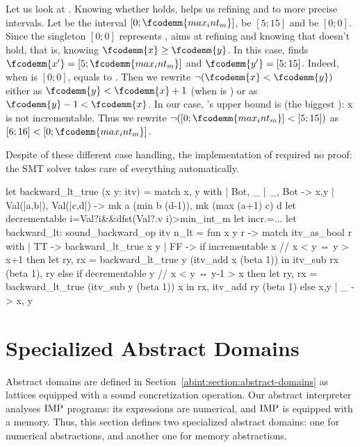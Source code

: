 \documentclass{llncs}
\begin{document}
%
Let us look at .
%
Knowing whether  holds,  helps us
refining  and  to more precise intervals.
%
Let  be the interval $[0;\fcodemm{max_int_m}]$, 
be $[5;15]$ and  be $[0;0]$.
%
Since the singleton $[0;0]$ represents ,
 aims at refining  and 
knowing that  doesn't hold, that is, knowing
$\fcodemm{x} \geq \fcodemm{y}$.
%
In this case,  finds $\fcodemm{x'} =
[5;\fcodemm{max_int_m}]$ and $\fcodemm{y'} = [5;15]$.
%
Indeed, when  is $[0;0]$,  equals to
.
%
Then we rewrite $\neg(\fcodemm{x} < \fcodemm{y})$ either as
$\fcodemm{y} < \fcodemm{x} + 1$ (when  is
) or as $\fcodemm{y}-1 < \fcodemm{x}$.
%
In our case, 's upper bound is  (the
biggest ): x is not incrementable.
%
Thus we rewrite $\neg([0;\fcodemm{max_int_m}] < [5;15])$ as $[6;16]
< [0;\fcodemm{max_int_m}]$.
%

Despite of these different case handling, the implementation of
 required no proof: the SMT solver takes care
of everything automatically.
%
\begin{fstarcode}
let backward_lt_true (x y: itv)
  = match x, y with | Bot, _ | _, Bot -> x,y
  | Val(|a,b|), Val(|c,d|) -> mk a (min b (d-1)), mk (max (a+1) c) d
let decrementable i=Val?i&&dfst(Val?.v i)>min_int_m  let incr.=...
let backward_lt: sound_backward_op itv n_lt
  = fun x y r -> match itv_as_bool r with | TT -> backward_lt_true x y
  | FF -> if incrementable x // x < y ⇔ y > x+1
         then let ry, rx = backward_lt_true y (itv_add x (beta 1)) in
              itv_sub rx (beta 1), ry
         else if decrementable y // x < y ⇔ y-1 > x
              then let ry, rx = backward_lt_true (itv_sub y (beta 1)) x in
                   rx, itv_add ry (beta 1)
              else x,y | _ -> x, y
\end{fstarcode}
%
\section{Specialized Abstract Domains}
\label{abint:section:specialized-adoms}
%
Abstract domains are defined in Section~\ref{abint:section:abstract-domains} as
lattices equipped with a sound concretization operation.
%
Our abstract interpreter analyses $\textrm{IMP}{}$ programs: its
expressions are numerical, and $\textrm{IMP}{}$ is equipped with a memory.
Thus, this section defines two specialized abstract domains: one
for numerical abstractions, and another one for memory
abstractions.
%
\end{document}

